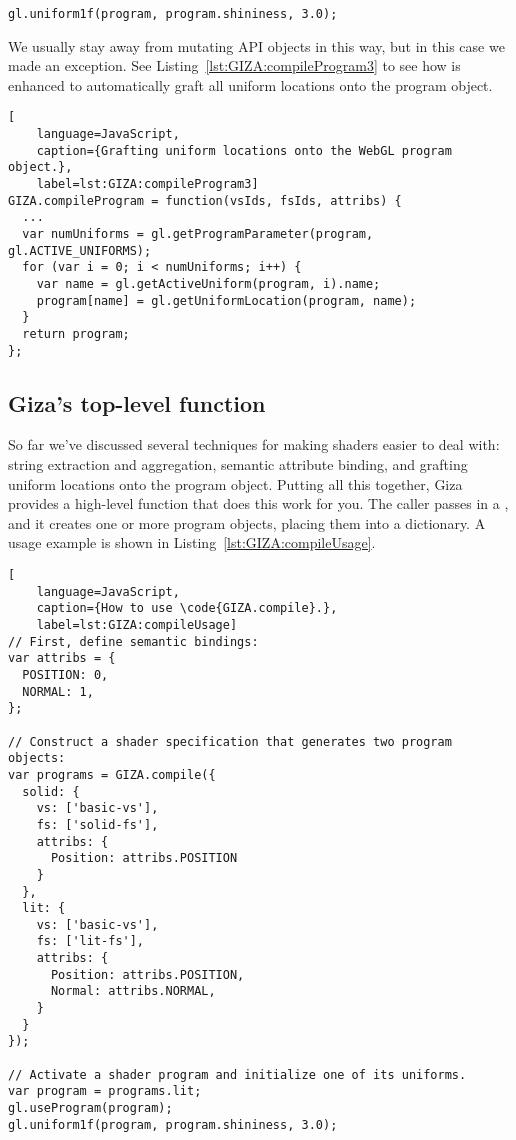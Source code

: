 \begin{lstlisting}
gl.uniform1f(program, program.shininess, 3.0);
\end{lstlisting}

We usually stay away from mutating API objects in this way, but in this case we made an exception.  See Listing~\ref{lst:GIZA:compileProgram3} to see how  is enhanced to automatically graft all uniform locations onto the program object.

\begin{lstlisting}[
    language=JavaScript,
    caption={Grafting uniform locations onto the WebGL program object.},
    label=lst:GIZA:compileProgram3]
GIZA.compileProgram = function(vsIds, fsIds, attribs) {
  ...
  var numUniforms = gl.getProgramParameter(program, gl.ACTIVE_UNIFORMS);
  for (var i = 0; i < numUniforms; i++) {
    var name = gl.getActiveUniform(program, i).name;
    program[name] = gl.getUniformLocation(program, name);
  }
  return program;
};
\end{lstlisting}

\subsection{Giza's top-level  function}

So far we've discussed several techniques for making shaders easier to deal with: string extraction and aggregation, semantic attribute binding, and grafting uniform locations onto the program object.  Putting all this together, Giza provides a high-level  function that does this work for you.  The caller passes in a , and it creates one or more program objects, placing them into a dictionary.  A usage example is shown in Listing~\ref{lst:GIZA:compileUsage}.

\begin{lstlisting}[
    language=JavaScript,
    caption={How to use \code{GIZA.compile}.},
    label=lst:GIZA:compileUsage]
// First, define semantic bindings:
var attribs = {
  POSITION: 0,
  NORMAL: 1,
};

// Construct a shader specification that generates two program objects:
var programs = GIZA.compile({
  solid: {
    vs: ['basic-vs'],
    fs: ['solid-fs'],
    attribs: {
      Position: attribs.POSITION
    }
  },
  lit: {
    vs: ['basic-vs'],
    fs: ['lit-fs'],
    attribs: {
      Position: attribs.POSITION,
      Normal: attribs.NORMAL,
    }
  }
});

// Activate a shader program and initialize one of its uniforms.
var program = programs.lit;
gl.useProgram(program);
gl.uniform1f(program, program.shininess, 3.0);
\end{lstlisting}

